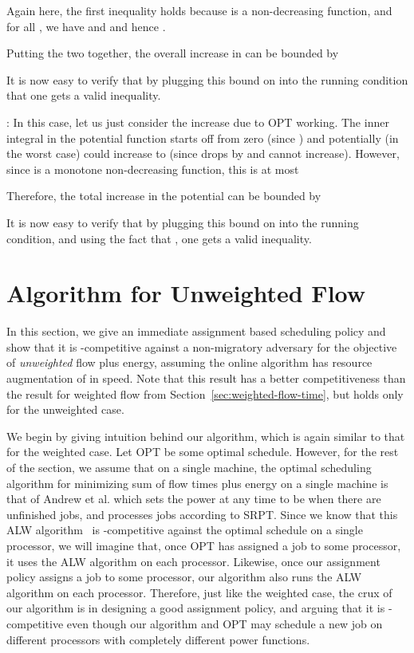 \documentclass[11pt]{article}
\newenvironment{proof}{\vspace{-0.15in}\noindent{\bf Proof:}}{\hspace*{\fill}\par}
\newcommand{\opt}{\textrm{\sc OPT}\xspace}
\newcommand{\alw}{{\sf ALW}\xspace}
\begin{document}
\begin{proof}
Again here, the first inequality holds because  is a non-decreasing function, and for all , we have  and  and hence .

Putting the two together, the overall increase in  can be
bounded by

It is now easy to verify that by plugging this bound on  into the
running condition that one gets a valid inequality.

\medskip {}: In this case,
let us just consider the increase due to \opt working. The inner
integral in the potential function starts off from zero (since ) and potentially (in the worst case) could increase to
 (since  drops by  and  cannot
increase). However, since  is a monotone non-decreasing
function, this is at most

Therefore, the total increase in the potential  can be
bounded by

It is now easy to verify that by plugging this bound on 
into the
running condition,
and using the fact that ,
one gets a valid inequality.
\end{proof}


\section{Algorithm for Unweighted Flow}
\label{dsec:unweighted-flow}

In this section, we give an immediate assignment based scheduling policy
and show that it is -competitive against a non-migratory
adversary for the objective of \emph{unweighted} flow plus energy,
assuming the online algorithm has resource augmentation of
 in speed. Note that this result has a better
competitiveness than the result for weighted flow from
Section~\ref{sec:weighted-flow-time}, but holds only for the unweighted case.

We begin by giving intuition behind our algorithm, which is again
similar to that for the weighted case. Let \opt be some optimal
schedule. 
However, for the rest of the section, we assume that on a single machine, the optimal scheduling algorithm for minimizing sum of flow times plus energy on a single machine
is that of Andrew et al.\cite{Lachlan2009} which sets the power at any time to be  when there are  unfinished jobs, and processes jobs according to SRPT.
Since we know that this \alw algorithm~\cite{Lachlan2009} is
-competitive against the optimal schedule on a single processor, we
will imagine that, once \opt has assigned a job to some processor, it
uses the \alw algorithm on each processor. Likewise, once our assignment
policy assigns a job to some processor, our algorithm also runs the \alw algorithm on each processor.
Therefore, just like the weighted case, the crux of our algorithm is in designing a good assignment policy,
and arguing that it is -competitive even though our algorithm and
\opt may schedule a new job on different processors with completely
different power functions.
\end{document}
